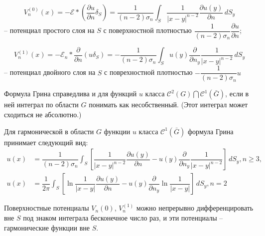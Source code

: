 \[
  V_n^{(0)} (x) = - \mathcal{E} * \left( \dfrac{\partial u}{\partial n} \delta_S \right) 
  = \dfrac{1}{(n-2) \sigma_n} \int_S \dfrac{1}{|x-y|^{n-2}} \dfrac{\partial u(y)}{\partial n} \, dS_y
\]
-- потенциал простого слоя на $S$ с поверхностной плотностью $\dfrac{1}{(n-2) \sigma_n} \dfrac{\partial u}{\partial n}$;

\[
  V_n^{(1)} (x) = - \mathcal{E}_n * \dfrac{\partial }{\partial n} (u \delta_S)
  = - \dfrac{1}{(n-2) \sigma_n} \int_S u(y) \dfrac{\partial }{\partial n_y} \dfrac{1}{|x-y|^{n-2}} \, dS_y
\]
-- потенциал двойного слоя на $S$ с поврехностной плотностью $-\dfrac{1}{(n-2) \sigma_n} u$

Формула Грина справедлива и для функций $u$ класса
$\mathcal{C}^2 (G) \bigcap \mathcal{C}^1 (\bar G)$, если в ней интеграл по области $G$ понимать
как несобственный. (Этот интеграл может сходиться не абсолютно.)

Для гармонической в области $G$ функции $u$ класса $\mathcal{C}^1 (\bar G)$ формула Грина принимает
следующий вид:
\begin{align*}
  u(x) &= \dfrac{1}{(n-2) \sigma_n} \int_S \left[ 
    \dfrac{1}{|x-y|^{n-2}} \dfrac{\partial u(y)}{\partial n}
    - u(y) \dfrac{\partial }{\partial n_y} \dfrac{1}{|x-y|^{n-2}}\right] \, dS_y, n \geqslant 3, \\
  u(x) &= \dfrac{1}{2\pi} \int_S \left[ 
    \ln \dfrac{1}{|x-y|} \dfrac{\partial u(y)}{\partial n}
    - u(y) \dfrac{\partial }{\partial n_y} \ln \dfrac{1}{|x-y|}\right] \, dS_y, n=2
\end{align*}

Поверхностные потенциалы $V_n{(0)}$, $V_n^{(1)}$ можно непрерывно дифференцировать вне $S$ под
знаком интеграла бесконечное число раз, и эти потенциалы -- гармонические функции вне $S$.

